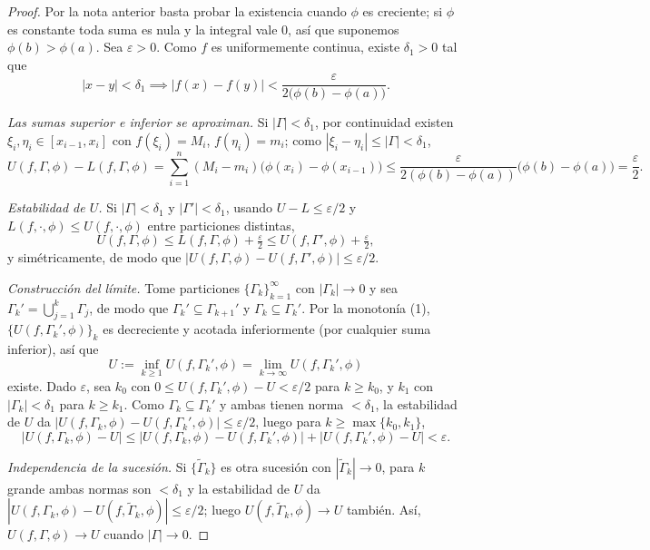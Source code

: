\documentclass[11pt,twoside]{article}
\begin{document}
\begin{proof}
Por la nota anterior basta probar la existencia cuando $\phi$ es creciente; si $\phi$ es constante toda suma es nula y la integral vale $0$, as\'i que suponemos $\phi(b) > \phi(a)$. Sea $\varepsilon > 0$. Como $f$ es uniformemente continua, existe $\delta_{1} > 0$ tal que
\[
|x - y| < \delta_{1} \implies |f(x) - f(y)| < \frac{\varepsilon}{2\big(\phi(b) - \phi(a)\big)}.
\]

\emph{Las sumas superior e inferior se aproximan.} Si $|\Gamma| < \delta_{1}$, por continuidad existen $\xi_{i}, \eta_{i} \in [x_{i-1}, x_{i}]$ con $f(\xi_{i}) = M_{i}$, $f(\eta_{i}) = m_{i}$; como $|\xi_{i} - \eta_{i}| \leq |\Gamma| < \delta_{1}$,
\[
U(f, \Gamma, \phi) - L(f, \Gamma, \phi) = \sum_{i=1}^{n} (M_{i} - m_{i})\big(\phi(x_{i}) - \phi(x_{i-1})\big) \leq \frac{\varepsilon}{2(\phi(b) - \phi(a))}\big(\phi(b) - \phi(a)\big) = \frac{\varepsilon}{2}.
\]

\emph{Estabilidad de $U$.} Si $|\Gamma| < \delta_{1}$ y $|\Gamma'| < \delta_{1}$, usando $U - L \leq \varepsilon/2$ y $L(f, \cdot, \phi) \leq U(f, \cdot, \phi)$ entre particiones distintas,
\[
U(f, \Gamma, \phi) \leq L(f, \Gamma, \phi) + \tfrac{\varepsilon}{2} \leq U(f, \Gamma', \phi) + \tfrac{\varepsilon}{2},
\]
y sim\'etricamente, de modo que $|U(f, \Gamma, \phi) - U(f, \Gamma', \phi)| \leq \varepsilon/2$.

\emph{Construcci\'on del l\'imite.} Tome particiones $\{\Gamma_{k}\}_{k=1}^{\infty}$ con $|\Gamma_{k}| \to 0$ y sea $\Gamma_{k}' = \bigcup_{j=1}^{k} \Gamma_{j}$, de modo que $\Gamma_{k}' \subseteq \Gamma_{k+1}'$ y $\Gamma_{k} \subseteq \Gamma_{k}'$. Por la monoton\'ia (1), $\{U(f, \Gamma_{k}', \phi)\}_{k}$ es decreciente y acotada inferiormente (por cualquier suma inferior), as\'i que
\[
U := \inf_{k \geq 1} U(f, \Gamma_{k}', \phi) = \lim_{k \to \infty} U(f, \Gamma_{k}', \phi)
\]
existe. Dado $\varepsilon$, sea $k_{0}$ con $0 \leq U(f, \Gamma_{k}', \phi) - U < \varepsilon/2$ para $k \geq k_{0}$, y $k_{1}$ con $|\Gamma_{k}| < \delta_{1}$ para $k \geq k_{1}$. Como $\Gamma_{k} \subseteq \Gamma_{k}'$ y ambas tienen norma $< \delta_{1}$, la estabilidad de $U$ da $|U(f, \Gamma_{k}, \phi) - U(f, \Gamma_{k}', \phi)| \leq \varepsilon/2$, luego para $k \geq \max\{k_{0}, k_{1}\}$,
\[
|U(f, \Gamma_{k}, \phi) - U| \leq |U(f, \Gamma_{k}, \phi) - U(f, \Gamma_{k}', \phi)| + |U(f, \Gamma_{k}', \phi) - U| < \varepsilon.
\]

\emph{Independencia de la sucesi\'on.} Si $\{\widetilde{\Gamma}_{k}\}$ es otra sucesi\'on con $|\widetilde{\Gamma}_{k}| \to 0$, para $k$ grande ambas normas son $< \delta_{1}$ y la estabilidad de $U$ da $|U(f, \Gamma_{k}, \phi) - U(f, \widetilde{\Gamma}_{k}, \phi)| \leq \varepsilon/2$; luego $U(f, \widetilde{\Gamma}_{k}, \phi) \to U$ tambi\'en. As\'i, $U(f, \Gamma, \phi) \to U$ cuando $|\Gamma| \to 0$.


\end{proof}
\end{document}
